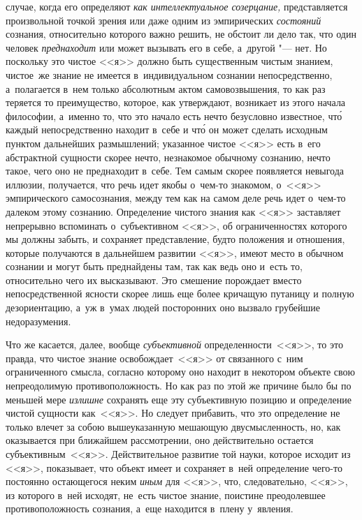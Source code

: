 случае, когда его определяют {\em как интеллектуальное созерцание,}
представляется произвольной точкой зрения или даже одним из эмпирических
{\em состояний} сознания, относительно которого важно решить, не обстоит ли
дело так, что один человек {\em преднаходит} или может вызывать его в себе,
а~другой "--- нет. Но поскольку это чистое <<я>> должно быть существенным
чистым знанием, чистое~же знание не имеется в~индивидуальном сознании
непосредственно, а~полагается в~нем только абсолютным актом самовозвышения, то
как раз теряется то преимущество, которое, как утверждают, возникает из этого
начала философии, а~именно то, что это начало есть нечто безусловно известное,
чт\'{о} каждый непосредственно находит в~себе и чт\'{о} он может сделать
исходным пунктом дальнейших размышлений; указанное чистое <<я>> есть в~его
абстрактной сущности скорее нечто, незнакомое обычному сознанию, нечто такое,
чего оно не преднаходит в~себе. Тем самым скорее появляется невыгода иллюзии,
получается, что речь идет якобы о~чем-то знакомом, о~<<я>> эмпирического
самосознания, между тем как на самом деле речь идет о~чем-то далеком этому
сознанию. Определение чистого знания как <<я>> заставляет непрерывно вспоминать
о~субъективном <<я>>, об ограниченностях которого мы должны забыть, и сохраняет
представление, будто положения и отношения, которые получаются в дальнейшем
развитии <<я>>, имеют место в обычном сознании и могут быть преднайдены там,
так как ведь оно и~есть то, относительно чего их высказывают. Это смешение
порождает вместо непосредственной ясности скорее лишь еще более кричащую
путаницу и полную дезориентацию, а~уж в~умах людей посторонних оно вызвало
грубейшие недоразумения.

Что же касается, далее, вообще {\em субъективной} определенности~<<я>>, то это
правда, что чистое знание освобождает~<<я>> от связанного с~ним ограниченного
смысла, согласно которому оно находит в некотором объекте свою непреодолимую
противоположность. Но как раз по этой же причине было бы по меньшей мере
{\em излишне} сохранять еще эту субъективную позицию и определение чистой
сущности как~<<я>>. Но следует прибавить, что это определение не только влечет
за собою вышеуказанную мешающую двусмысленность, но, как оказывается при
ближайшем рассмотрении, оно действительно остается субъективным~<<я>>.
Действительное развитие той науки, которое исходит из <<я>>, показывает, что
объект имеет и сохраняет в~ней определение чего-то постоянно остающегося неким
{\em иным} для <<я>>, что, следовательно, <<я>>, из которого в~ней исходят,
не~есть чистое знание, поистине преодолевшее противоположность сознания, а~еще
находится в~плену у~явления.

